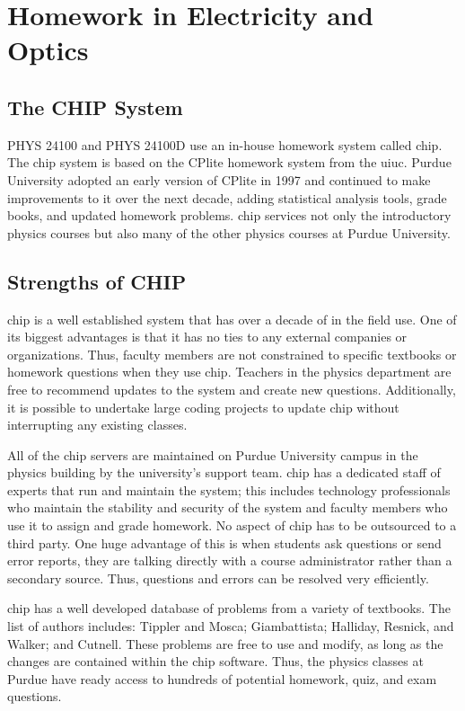 \section{Homework in Electricity and Optics}

\subsection{The CHIP System}

PHYS 24100 and PHYS 24100D use an in-house homework system called \gls{chip}. The \gls{chip} system is based on the CPlite homework system from the \gls{uiuc}. Purdue University adopted an early version of CPlite in 1997 and continued to make improvements to it over the next decade, adding statistical analysis tools, grade books, and updated homework problems. \gls{chip} services not only the introductory physics courses but also many of the other physics courses at Purdue University\cite{saxena1998}.

\subsection{Strengths of CHIP}

\gls{chip} is a well established system that has over a decade of in the field use. One of its biggest advantages is that it has no ties to any external companies or organizations. Thus, faculty members are not constrained to specific textbooks or homework questions when they use \gls{chip}. Teachers in the physics department are free to recommend updates to the system and create new questions. Additionally, it is possible to undertake large coding projects to update \gls{chip} without interrupting any existing classes.

All of the \gls{chip} servers are maintained on Purdue University campus in the physics building by the university's support team. \gls{chip} has a dedicated staff of experts that run and maintain the system; this includes technology professionals who maintain the stability and security of the system and faculty members who use it to assign and grade homework. No aspect of \gls{chip} has to be outsourced to a third party. One huge advantage of this is when students ask questions or send error reports, they are talking directly with a course administrator rather than a secondary source. Thus, questions and errors can be resolved very efficiently.

\gls{chip} has a well developed database of problems from a variety of textbooks. The list of authors includes: Tippler and Mosca\cite{tipler2003}; Giambattista\cite{giambattista2009}; Halliday, Resnick, and Walker\cite{hrw2013}; and Cutnell\cite{cutnell2009}. These problems are free to use and modify, as long as the changes are contained within the \gls{chip} software. Thus, the physics classes at Purdue have ready access to hundreds of potential homework, quiz, and exam questions.

